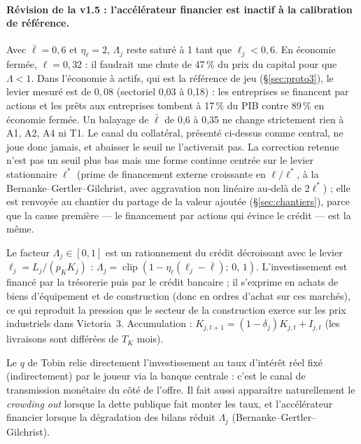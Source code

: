 \documentclass[11pt,a4paper]{article}
\newcommand{\clip}[3]{\operatorname{clip}\!\left(#1;\,#2,\,#3\right)}
\begin{document}
\begin{lecture}
\paragraph{Révision de la v1.5 : l'accélérateur financier est inactif à la calibration de référence.} Avec $\bar\ell=0{,}6$ et $\eta_\ell=2$, $\Lambda_j$ reste saturé à 1 tant que $\ell_j<0{,}6$. En économie fermée, $\ell=0{,}32$ : il faudrait une chute de 47\,\% du prix du capital pour que $\Lambda<1$. Dans l'économie à actifs, qui est la référence de jeu (\S\ref{sec:proto3}), le levier mesuré est de $0{,}08$ (sectoriel 0,03 à 0,18) : les entreprises se financent par actions et les prêts aux entreprises tombent à 17\,\% du PIB contre 89\,\% en économie fermée. Un balayage de $\bar\ell$ de 0,6 à 0,35 ne change strictement rien à A1, A2, A4 ni T1. Le canal du collatéral, présenté ci-dessus comme central, ne joue donc jamais, et abaisser le seuil ne l'activerait pas. La correction retenue n'est pas un seuil plus bas mais une forme continue centrée sur le levier stationnaire $\ell^\ast$ (prime de financement externe croissante en $\ell/\ell^\ast$, à la Bernanke--Gertler--Gilchrist, avec aggravation non linéaire au-delà de $2\ell^\ast$) ; elle est renvoyée au chantier du partage de la valeur ajoutée (\S\ref{sec:chantiers}), parce que la cause première — le financement par actions qui évince le crédit — est la même.
\end{lecture}
Le facteur $\Lambda_j \in [0,1]$ est un rationnement du crédit décroissant avec le levier $\ell_j = L_j/(p_K K_j)$ : $\Lambda_j = \clip{1 - \eta_\ell(\ell_j - \bar\ell)}{0}{1}$. L'investissement est financé par la trésorerie puis par le crédit bancaire ; il s'exprime en achats de biens d'équipement et de construction (donc en ordres d'achat sur ces marchés), ce qui reproduit la pression que le secteur de la construction exerce sur les prix industriels dans Victoria~3. Accumulation : $K_{j,t+1} = (1-\delta_j) K_{j,t} + I_{j,t}$ (les livraisons sont différées de $T_K$ mois).

\begin{lit}
Le $q$ de Tobin relie directement l'investissement au taux d'intérêt réel fixé (indirectement) par le joueur via la banque centrale : c'est le canal de transmission monétaire du côté de l'offre. Il fait aussi apparaître naturellement le \emph{crowding out} lorsque la dette publique fait monter les taux, et l'accélérateur financier lorsque la dégradation des bilans réduit $\Lambda_j$ (Bernanke--Gertler--Gilchrist).
\end{lit}
\end{document}
